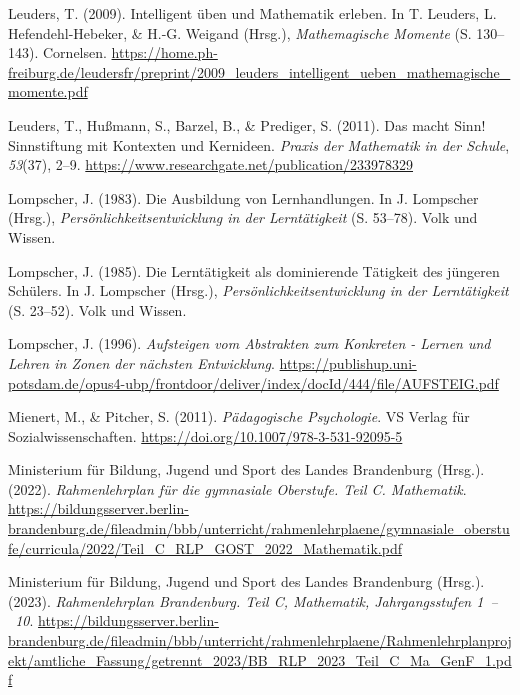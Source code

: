 \documentclass[
]{scrbook}
\newlength{\cslhangindent}
\newenvironment{CSLReferences}[2] %
 {\begin{list}{}{%
  \setlength{\itemindent}{0pt}
  \setlength{\leftmargin}{0pt}
  \setlength{\parsep}{0pt}
  \ifodd #1
   \setlength{\leftmargin}{\cslhangindent}
   \setlength{\itemindent}{-1\cslhangindent}
  \fi
  \setlength{\itemsep}{#2\baselineskip}}}
 {\end{list}}
\theoremstyle{definition}
\theoremstyle{definition}
\theoremstyle{definition}
\theoremstyle{definition}
\theoremstyle{remark}
\begin{document}
\begin{CSLReferences}{1}{0}
Leuders, T. (2009). Intelligent üben und {Mathematik} erleben. In T. Leuders, L. Hefendehl-Hebeker, \& H.-G. Weigand (Hrsg.), \emph{Mathemagische {Momente}} (S. 130--143). Cornelsen. \url{https://home.ph-freiburg.de/leudersfr/preprint/2009_leuders_intelligent_ueben_mathemagische_momente.pdf}

Leuders, T., Hußmann, S., Barzel, B., \& Prediger, S. (2011). Das macht {Sinn}! {Sinnstiftung} mit {Kontexten} und {Kernideen}. \emph{Praxis der Mathematik in der Schule}, \emph{53}(37), 2--9. \url{https://www.researchgate.net/publication/233978329}

Lompscher, J. (1983). Die {Ausbildung} von {Lernhandlungen}. In J. Lompscher (Hrsg.), \emph{Persönlichkeitsentwicklung in der {Lerntätigkeit}} (S. 53--78). Volk und Wissen.

Lompscher, J. (1985). Die {Lerntätigkeit} als dominierende {Tätigkeit} des jüngeren {Schülers}. In J. Lompscher (Hrsg.), \emph{Persönlichkeitsentwicklung in der {Lerntätigkeit}} (S. 23--52). Volk und Wissen.

Lompscher, J. (1996). \emph{Aufsteigen vom {Abstrakten} zum {Konkreten} - {Lernen} und {Lehren} in {Zonen} der nächsten {Entwicklung}}. \url{https://publishup.uni-potsdam.de/opus4-ubp/frontdoor/deliver/index/docId/444/file/AUFSTEIG.pdf}

Mienert, M., \& Pitcher, S. (2011). \emph{Pädagogische {Psychologie}}. VS Verlag für Sozialwissenschaften. \url{https://doi.org/10.1007/978-3-531-92095-5}

Ministerium für Bildung, Jugend und Sport des Landes Brandenburg (Hrsg.). (2022). \emph{Rahmenlehrplan für die gymnasiale {Oberstufe}. {Teil} {C}. {Mathematik}}. \url{https://bildungsserver.berlin-brandenburg.de/fileadmin/bbb/unterricht/rahmenlehrplaene/gymnasiale_oberstufe/curricula/2022/Teil_C_RLP_GOST_2022_Mathematik.pdf}

Ministerium für Bildung, Jugend und Sport des Landes Brandenburg (Hrsg.). (2023). \emph{Rahmenlehrplan {Brandenburg}. {Teil} {C}, {Mathematik}, {Jahrgangsstufen} 1~--~10}. \url{https://bildungsserver.berlin-brandenburg.de/fileadmin/bbb/unterricht/rahmenlehrplaene/Rahmenlehrplanprojekt/amtliche_Fassung/getrennt_2023/BB_RLP_2023_Teil_C_Ma_GenF_1.pdf}


\end{CSLReferences}
\end{document}
